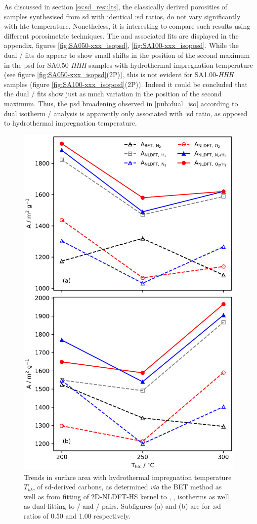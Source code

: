 As discussed in section \ref{ss:sd_results}, the classically derived porosities of samples synthesised from \acrfull{sd} with identical :\acrshort{sd} ratios, do not vary significantly with \acrshort{htc} temperature. Nonetheless, it is interesting to compare such results using different porosimetric techniques. The  and associated fits are displayed in the appendix, figures \ref{fig:SA050-xxx_isopsd}, \ref{fig:SA100-xxx_isoposd}. While the dual / fits do appear to show small shifts in the position of the second maximum in the \acrshort{psd} for SA0.50-\textit{HHH} samples with hydrothermal impregnation temperature (see figure \ref{fig:SA050-xxx_isopsd}(2P)), this is not evident for SA1.00-\textit{HHH} samples (figure \ref{fig:SA100-xxx_isoposd}(2P)). Indeed it could be concluded that the dual / fits show just as much variation in the position of the second maximum. Thus, the \acrshort{psd} broadening observed in \ref{pub:dual_iso} according to dual isotherm / analysis is apparently only associated with :\acrshort{sd} ratio, as opposed to hydrothermal impregnation temperature.

\begin{figure}[hb!]
    \centering
    \includegraphics[width=0.7\columnwidth,keepaspectratio]{5-dual_isotherm/figs/SD_classical_nldft.png}
    \caption{Trends in surface area with hydrothermal impregnation temperature $T_{htc}$ of \acrshort{sd}-derived carbons, as determined \textit{via} the BET method as well as from fitting of 2D-NLDFT-HS kernel to , ,  isotherms as well as dual-fitting to / and / pairs. Subfigures (a) and (b) are for :\acrshort{sd} ratios of 0.50 and 1.00 respectively.}
    \label{fig:classical_nldft_compare}
\end{figure}

